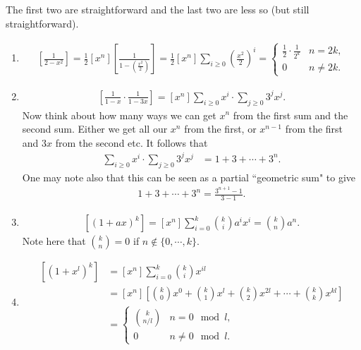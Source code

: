 \begin{enumerate}
     The first two are straightforward and the last two are less so (but still straightforward).
    \begin{enumerate}
        \item 
        \begin{align*}
            [x^n] \left[ \frac{1}{2-x^2} \right] = \frac{1}{2}[x^n] \left[ \frac{1}{1-(\frac{x^2}{2})} \right] = \frac{1}{2} [x^n] \sum_{i \geq 0} \left(\frac{x^2}{2}\right)^i = \begin{cases}
                \frac{1}{2} \cdot \frac{1}{2^k} & n = 2k,\\
                0 & n \neq 2k.
            \end{cases}
        \end{align*}
        \item 
        \begin{align*}
            [x^n] \left[ \frac{1}{1-x} \cdot \frac{1}{1-3x} \right] = [x^n] \sum_{i \geq 0} x^i \cdot \sum_{j \geq 0} 3^j x^j.
        \end{align*}
        Now think about how many ways we can get $x^n$ from the first sum and the second sum. Either we get all our $x^n$ from the first, or $x^{n-1}$ from the first and $3 x$ from the second etc. It follows that
        \begin{align*}
            [x^n] \sum_{i \geq 0} x^i \cdot \sum_{j \geq 0} 3^j x^j &= 1 + 3 + \cdots + 3^n.
        \end{align*}
        One may note also that this can be seen as a partial ``geometric sum" to give
        \begin{align*}
            1 + 3 + \cdots + 3^n = \frac{3^{n+1} - 1}{3-1}.
        \end{align*}
        \item
        \begin{align*}
            [x^n] \left[ (1+ax)^k \right] = [x^n] \sum_{i = 0}^k \binom{k}{i} a^{i} x^i =
                \binom{k}{n} a^n.
        \end{align*}
        Note here that $\binom{k}{n} = 0$ if $n \not\in \{ 0, \cdots, k\}$.
        \item
        \begin{align*}
            [x^n] \left[ (1+x^l)^k \right] &= [x^n] \sum_{i=0}^k \binom{k}{i} x^{il}\\ &= [x^n] \left[\binom{k}{0} x^{0} + \binom{k}{1} x^l + \binom{k}{2} x^{2l} + \cdots + \binom{k}{k} x^{kl} \right]\\
            &=
            \begin{cases}
                \binom{k}{n/l} & n = 0 \mod l,\\
                0 & n \neq 0 \mod l.
            \end{cases}
        \end{align*}
    \end{enumerate}


\end{enumerate}

